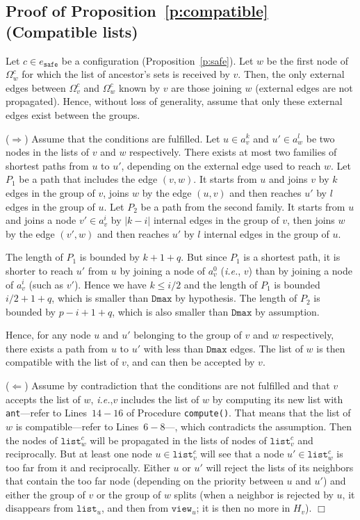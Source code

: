 \documentclass[11pt,english]{article}
\newcommand{\Latin}[1]{\textit{#1}}
\newcommand{\ie}{\Latin{i.e.},\xspace}
\newenvironment{proof}[1][0cm]{
  \begin{list}{\bf Proof.~}{
      \setlength{\itemindent}{0cm}
      \setlength{\labelsep}{0cm}
      \setlength{\labelwidth}{#1}
      \setlength{\leftmargin}{#1}
    \item
    }
}{\hfill$\Box$
  \end{list}
}
\begin{document}
\subsection{Proof of Proposition~\ref{p:compatible} (Compatible lists)}
\begin{proof}
  Let $c \in e_\texttt{safe}$ be a configuration (Proposition~\ref{p:safe}).
  Let $w$ be the first node of $\Omega_w^c$ for which the list of ancestor's sets is
  received by $v$. Then, the only external edges between $\Omega_v^c$ and $\Omega_w^c$
  known by $v$ are those joining $w$ (external edges are not propagated). Hence,
  without loss of generality, assume that only these external edges exist
  between the groups.

  \noindent ($\Rightarrow$) Assume that the conditions are fulfilled.
Let $u \in a_v^k$ and $u' \in a_w^l$ be two nodes in the lists of $v$ and $w$
  respectively. There exists at most two families of shortest paths from $u$ to
  $u'$, depending on the external edge used to reach $w$.
Let $P_1$ be a path that includes the edge $(v,w)$. It starts from $u$ and
  joins $v$ by $k$ edges in the group of $v$, joins $w$ by the edge $(u,v)$ and
  then reaches $u'$ by $l$ edges in the group of $u$.
Let $P_2$ be a path from the second family. It starts from $u$ and joins a
  node $v' \in a_v^i$ by $|k-i|$ internal edges in the group of $v$, then joins
  $w$ by the edge $(v',w)$ and then reaches $u'$ by $l$ internal edges in the
  group of $u$.

  The length of $P_1$ is bounded by $k + 1 + q$.  But since $P_1$ is a shortest
  path, it is shorter to reach $u'$ from $u$ by joining a node of $a_v^0$ (\ie
  $v$) than by joining a node of $a_v^i$ (such as $v'$). Hence we have $k \leq
  i/2$ and the length of $P_1$ is bounded $i/2 + 1 + q$, which is smaller than
  $\texttt{Dmax}$ by hypothesis.
The length of $P_2$ is bounded by $p - i + 1 + q$, which is also smaller than
  $\texttt{Dmax}$ by assumption.

  Hence, for any node $u$ and $u'$ belonging to the group of $v$ and $w$
  respectively, there exists a path from $u$ to $u'$ with less than
  $\texttt{Dmax}$ edges. The list of $w$ is then compatible with the list of
  $v$, and can then be accepted by $v$.

  \noindent ($\Leftarrow$) Assume by contradiction that the conditions are not
  fulfilled and that $v$ accepts the list of $w$, \ie $v$ includes the list of
  $w$ by computing its new list with \texttt{ant}---refer to Lines~$14-16$ of
  Procedure \texttt{compute()}.  That means that the list of $w$ is
  compatible---refer to Lines~$6-8$---, which contradicts the assumption.  Then
  the nodes of $\texttt{list}_w^c$ will be propagated in the lists of nodes of
  $\texttt{list}_v^c$ and reciprocally. But at least one node $u \in
  \texttt{list}_v^c$ will see that a node $u' \in \texttt{list}_w^c$ is too
  far from it and reciprocally. Either $u$ or $u'$ will reject the lists of its
  neighbors that contain the too far node (depending on the priority between $u$
  and $u'$) and either the group of $v$ or the group of $w$ splits (when a
  neighbor is rejected by $u$, it disappears from $\texttt{list}_u$, and then
  from $\texttt{view}_u$; it is then no more in $H_v$).
\end{proof}
\end{document}
